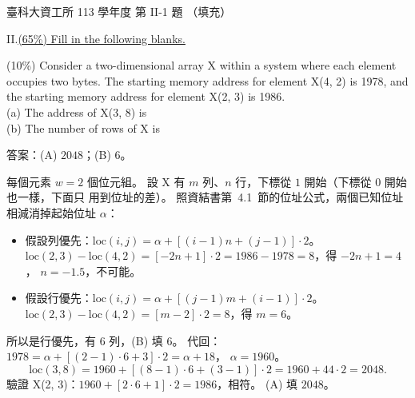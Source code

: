 \begin{pastexam}[label={px:ntust-113-ice-07}]{臺科大資工所 113 學年度 第 II-1 題}
（填充）

II.\quad \underline{(65\%) Fill in the following blanks.}

(10\%) Consider a two-dimensional array X within a system where each element occupies two bytes. The
starting memory address for element X(4, 2) is 1978, and the starting memory address for element
X(2, 3) is 1986.\\
(a) The address of X(3, 8) is \\
(b) The number of rows of X is 
\end{pastexam}

\begin{pastsoln}
答案：(A) $2048$；(B) $6$。

每個元素 $w = 2$ 個位元組。 設 X 有 $m$ 列、$n$ 行，下標從 $1$ 開始（下標從 $0$ 開始也一樣，下面只
用到位址的差）。 照資結書第~4.1~節的位址公式，兩個已知位址相減消掉起始位址 $\alpha$：
\begin{itemize}
\item 假設列優先：$\mathrm{loc}(i, j) = \alpha + [(i - 1) n + (j - 1)] \cdot 2$。
$\mathrm{loc}(2,3) - \mathrm{loc}(4,2) = [-2n + 1] \cdot 2 = 1986 - 1978 = 8$，得 $-2n + 1 = 4$，
$n = -1.5$，不可能。
\item 假設行優先：$\mathrm{loc}(i, j) = \alpha + [(j - 1) m + (i - 1)] \cdot 2$。
$\mathrm{loc}(2,3) - \mathrm{loc}(4,2) = [m - 2] \cdot 2 = 8$，得 $m = 6$。
\end{itemize}
所以是行優先，有 $6$ 列，(B) 填 $6$。 代回：$1978 = \alpha + [(2 - 1) \cdot 6 + 3] \cdot 2 = \alpha + 18$，
$\alpha = 1960$。
\[
\mathrm{loc}(3, 8) = 1960 + [(8 - 1) \cdot 6 + (3 - 1)] \cdot 2 = 1960 + 44 \cdot 2 = 2048 .
\]
驗證 X(2, 3)：$1960 + [2 \cdot 6 + 1] \cdot 2 = 1986$，相符。 (A) 填 $2048$。
\end{pastsoln}
